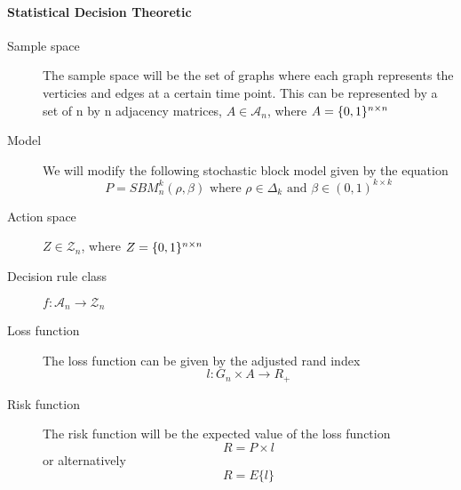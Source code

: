 \documentclass[12pt]{article}
\begin{document}
\pagebreak
\paragraph{Statistical Decision Theoretic}
\begin{description}
\item[Sample space]
The sample space will be the set of graphs where each graph represents the verticies and edges at a certain time point.  This can be represented by a set of n by n adjacency matrices, $A \in \mathcal{A}_n $, where $A = \{0,1\}^{n \times n} \\ $

\item[Model]
We will modify the following stochastic block model given by the equation
\begin{equation*}
P=SBM_n^k(\rho,\beta)\textrm{ where }\rho\in\Delta_k\textrm{ and }\beta\in(0,1)^{k\times k}
\end{equation*}

\item[Action space]
$Z \in \mathcal{Z}_n $, where $Z = \{0,1\}^{n \times n} \\ $


\item[Decision rule class]
$ f: \mathcal{A}_n \to \mathcal{Z}_n$

\item[Loss function]
The loss function can be given by the adjusted rand index 
\begin{equation*}
l:G_n\times A\to R_+
\end{equation*}


\item[Risk function]
The risk function will be the expected value of the loss function
\begin{equation*}
R=P\times l
\end{equation*}
or alternatively 
\begin{equation*}
	R=E\{l\}
\end{equation*}
\end{description}
\end{document}
